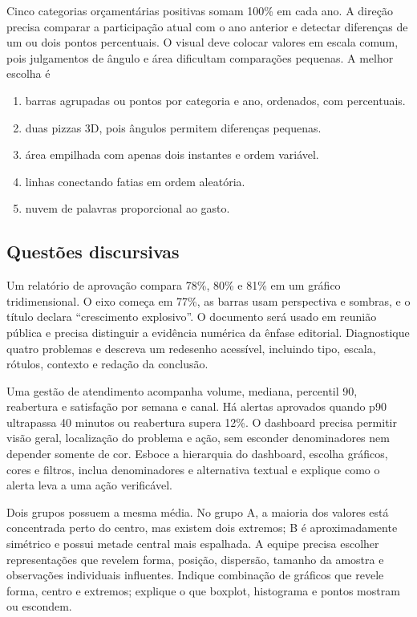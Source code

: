 \TextoBase Cinco categorias orçamentárias positivas somam 100\% em cada ano. A direção precisa comparar a participação atual com o ano anterior e detectar diferenças de um ou dois pontos percentuais. O visual deve colocar valores em escala comum, pois julgamentos de ângulo e área dificultam comparações pequenas.
\FonteDidatica
\Comando A melhor escolha é
\begin{enumerate}[label=\Alph*)]\item barras agrupadas ou pontos por categoria e ano, ordenados, com percentuais.\item duas pizzas 3D, pois ângulos permitem diferenças pequenas.\item área empilhada com apenas dois instantes e ordem variável.\item linhas conectando fatias em ordem aleatória.\item nuvem de palavras proporcional ao gasto.\end{enumerate}

\subsection{Questões discursivas}
\TextoBase Um relatório de aprovação compara 78\%, 80\% e 81\% em um gráfico tridimensional. O eixo começa em 77\%, as barras usam perspectiva e sombras, e o título declara ``crescimento explosivo''. O documento será usado em reunião pública e precisa distinguir a evidência numérica da ênfase editorial.
\FonteDidatica
\Comando Diagnostique quatro problemas e descreva um redesenho acessível, incluindo tipo, escala, rótulos, contexto e redação da conclusão.

\TextoBase Uma gestão de atendimento acompanha volume, mediana, percentil 90, reabertura e satisfação por semana e canal. Há alertas aprovados quando p90 ultrapassa 40 minutos ou reabertura supera 12\%. O dashboard precisa permitir visão geral, localização do problema e ação, sem esconder denominadores nem depender somente de cor.
\FonteDidatica
\Comando Esboce a hierarquia do dashboard, escolha gráficos, cores e filtros, inclua denominadores e alternativa textual e explique como o alerta leva a uma ação verificável.

\TextoBase Dois grupos possuem a mesma média. No grupo A, a maioria dos valores está concentrada perto do centro, mas existem dois extremos; B é aproximadamente simétrico e possui metade central mais espalhada. A equipe precisa escolher representações que revelem forma, posição, dispersão, tamanho da amostra e observações individuais influentes.
\FonteDidatica
\Comando Indique combinação de gráficos que revele forma, centro e extremos; explique o que boxplot, histograma e pontos mostram ou escondem.


